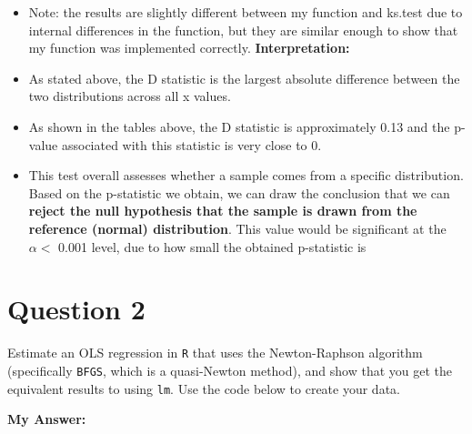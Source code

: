 \documentclass[12pt,letterpaper]{article}
\begin{document}
\begin{itemize}
\item Note: the results are slightly different between my function and ks.test due to internal differences in the function, but they are similar enough to show that my function was implemented correctly.
\newline \textbf{Interpretation:}
\item As stated above, the D statistic is the largest absolute difference between the two distributions across all x values. 
\item As shown in the tables above, the D statistic is approximately 0.13 and the p-value associated with this statistic is very close to 0.
\item This test overall assesses whether a sample comes from a specific distribution. Based on the p-statistic we obtain, we can draw the conclusion that we can \textbf{reject the null hypothesis that the sample is drawn from the reference (normal) distribution}. This value would be significant at the $\alpha <$ 0.001 level, due to how small the obtained p-statistic is


\end{itemize}

\section*{Question 2}
\noindent Estimate an OLS regression in \texttt{R} that uses the Newton-Raphson algorithm (specifically \texttt{BFGS}, which is a quasi-Newton method), and show that you get the equivalent results to using \texttt{lm}. Use the code below to create your data.
\vspace{.5cm}
 

\textbf{My Answer:}
\end{document}
